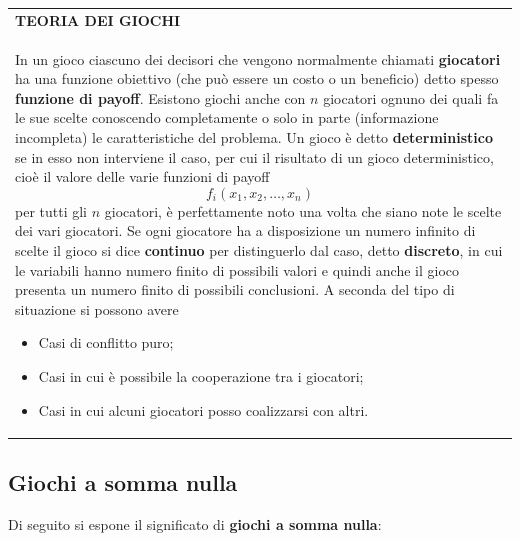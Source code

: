 \documentclass[a4paper]{extarticle}
\renewcommand\arraystretch{}
\begin{document}
\vspace{1em}
\setlength{\tabcolsep}{14pt}
\renewcommand{\arraystretch}{2}
\noindent
\begin{tabularx}{\textwidth}{@{}|P|@{}}
    \hline
    {\textbf{TEORIA DEI GIOCHI}}\\
    \parbox{\linewidth}{In un gioco ciascuno dei decisori che vengono normalmente chiamati \textbf{giocatori} ha una funzione obiettivo (che può essere un costo o un beneficio) detto spesso \textbf{funzione di payoff}.\\
    Esistono giochi anche con $n$ giocatori ognuno dei quali fa le sue scelte conoscendo completamente o solo in parte (informazione incompleta) le caratteristiche del problema.\\
    Un gioco è detto \textbf{deterministico} se in esso non interviene il caso, per cui il risultato di un gioco deterministico, cioè il valore delle varie funzioni di payoff
    \[f_i(x_1,x_2,\dots,x_n)\]
    per tutti gli $n$ giocatori, è perfettamente noto una volta che siano note le scelte dei vari giocatori.\\
    Se ogni giocatore ha a disposizione un numero infinito di scelte il gioco si dice \textbf{continuo} per distinguerlo dal caso, detto \textbf{discreto}, in cui le variabili hanno numero finito di possibili valori e quindi anche il gioco presenta un numero finito di possibili conclusioni. A seconda del tipo di situazione si possono avere
    \begin{itemize}
        \item Casi di conflitto puro;
        \item Casi in cui è possibile la cooperazione tra i giocatori;
        \item Casi in cui alcuni giocatori posso coalizzarsi con altri.
    \end{itemize}
    \vspace{1mm}}\\
    \hline
\end{tabularx}

\vspace{1em}
\subsection{Giochi a somma nulla}
Di seguito si espone il significato di \textbf{giochi a somma nulla}:
\end{document}

